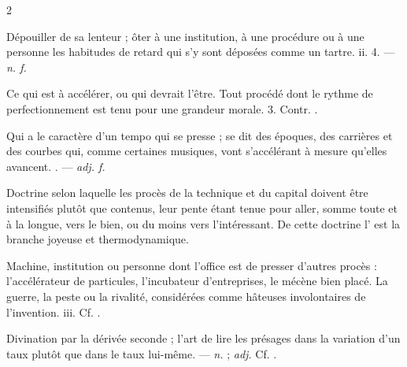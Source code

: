 \begin{multicols}{2}

 Dépouiller de sa lenteur ; ôter à une institution, à une procédure ou à une personne les habitudes de retard qui s'y sont déposées comme un tartre.   ii. 4. —  \textit{n. f.}

  Ce qui est à accélérer, ou qui devrait l'être.   Tout procédé dont le rythme de perfectionnement est tenu pour une grandeur morale.   3. Contr. .

 Qui a le caractère d'un tempo qui se presse ; se dit des époques, des carrières et des courbes qui, comme certaines musiques, vont s'accélérant à mesure qu'elles avancent. . —  \textit{adj. f.}

 Doctrine selon laquelle les procès de la technique et du capital doivent être intensifiés plutôt que contenus, leur pente étant tenue pour aller, somme toute et à la longue, vers le bien, ou du moins vers l'intéressant. De cette doctrine l' est la branche joyeuse et thermodynamique.

  Machine, institution ou personne dont l'office est de presser d'autres procès : l'accélérateur de particules, l'incubateur d'entreprises, le mécène bien placé.   La guerre, la peste ou la rivalité, considérées comme hâteuses involontaires de l'invention.   iii. Cf. .

 Divination par la dérivée seconde ; l'art de lire les présages dans la variation d'un taux plutôt que dans le taux lui-même.  —  \textit{n.} ;  \textit{adj.} Cf. .


\end{multicols}
